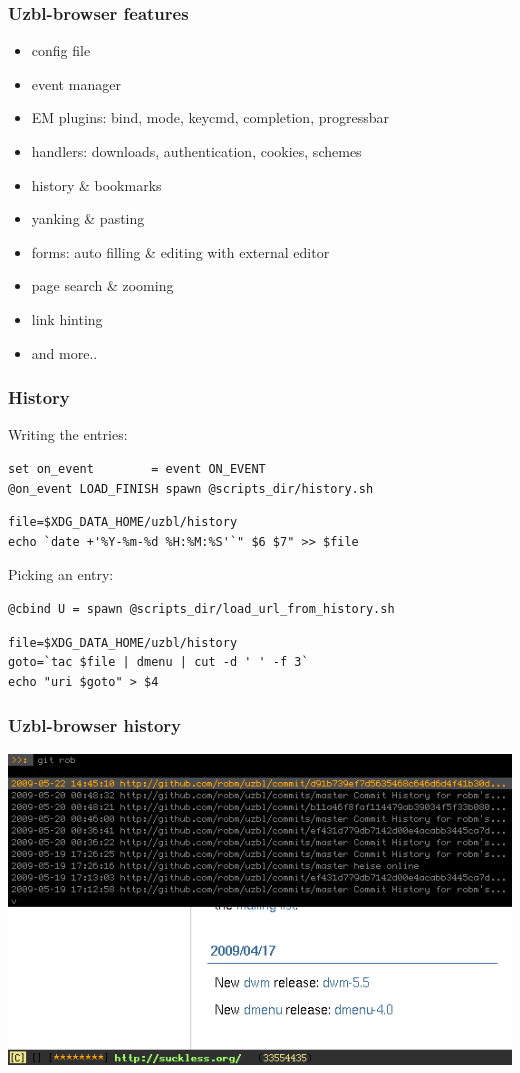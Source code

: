 \documentclass{beamer}
\begin{document}
\frame
{
\frametitle{Uzbl-browser features}
  \begin{itemize} %
\large
  \item config file
  \pause
  \item event manager %
  \item EM plugins: bind, mode, keycmd, completion, progressbar
  \pause
  \item handlers: downloads, authentication, cookies, schemes %
  \pause
  \item history \& bookmarks
  \pause
  \item yanking \& pasting %
  \pause
  \item forms: auto filling \& editing with external editor
  \pause
  \item page search \& zooming 
  \pause
  \item link hinting
  \pause
  \item and more..
  \end{itemize}
}


\begin{frame}[fragile]
\frametitle{History}
\large
Writing the entries:
\begin{lstlisting}
set on_event        = event ON_EVENT
@on_event LOAD_FINISH spawn @scripts_dir/history.sh
\end{lstlisting}  
\begin{lstlisting}
file=$XDG_DATA_HOME/uzbl/history
echo `date +'%Y-%m-%d %H:%M:%S'`" $6 $7" >> $file
\end{lstlisting}
\pause
Picking an entry:
\begin{lstlisting}
@cbind U = spawn @scripts_dir/load_url_from_history.sh
\end{lstlisting} 
\begin{lstlisting}
file=$XDG_DATA_HOME/uzbl/history
goto=`tac $file | dmenu | cut -d ' ' -f 3`
echo "uri $goto" > $4
\end{lstlisting}
\end{frame}

\begin{frame}[fragile]
\frametitle{Uzbl-browser history}
\includegraphics[scale=0.6]{history.png} %
\end{frame}
\end{document}
